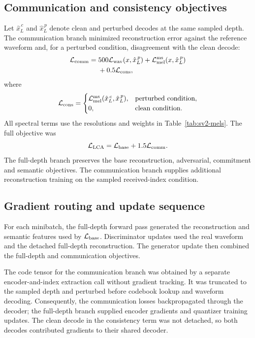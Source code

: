 \subsection{Communication and consistency objectives}
Let $\hat x_L^{\,c}$ and $\hat x_L^{\,p}$ denote clean and perturbed decodes at the same sampled depth. The communication branch minimized reconstruction error against the reference waveform and, for a perturbed condition, disagreement with the clean decode:
\begin{equation}
\begin{split}
 \mathcal L_{\rm comm}={}&
 500\mathcal L_{\rm wav}(x,\hat x_L^{\,p})
 +\mathcal L_{\rm mel}^{\rm ms}(x,\hat x_L^{\,p})\\
 &+0.5\mathcal L_{\rm cons},
\end{split}
\label{eq:sv2-comm}
\end{equation}
where
\begin{equation}
 \mathcal L_{\rm cons}=
 \begin{cases}
 \mathcal L_{\rm mel}^{\rm ms}(\hat x_L^{\,c},\hat x_L^{\,p}),
       & \text{perturbed condition},\\
 0,    & \text{clean condition}.
 \end{cases}
 \label{eq:sv2-consistency}
\end{equation}
All spectral terms use the resolutions and weights in Table~\ref{tab:sv2-mels}. The full objective was
\begin{equation}
 \mathcal L_{\rm LCA}
 =\mathcal L_{\rm base}+1.5\mathcal L_{\rm comm}.
 \label{eq:sv2-lca}
\end{equation}
The full-depth branch preserves the base reconstruction, adversarial, commitment and semantic objectives. The communication branch supplies additional reconstruction training on the sampled received-index condition.

\subsection{Gradient routing and update sequence}
For each minibatch, the full-depth forward pass generated the reconstruction and semantic features used by $\mathcal L_{\rm base}$. Discriminator updates used the real waveform and the detached full-depth reconstruction. The generator update then combined the full-depth and communication objectives.

The code tensor for the communication branch was obtained by a separate encoder-and-index extraction call without gradient tracking. It was truncated to the sampled depth and perturbed before codebook lookup and waveform decoding. Consequently, the communication losses backpropagated through the decoder; the full-depth branch supplied encoder gradients and quantizer training updates. The clean decode in the consistency term was not detached, so both decodes contributed gradients to their shared decoder.

